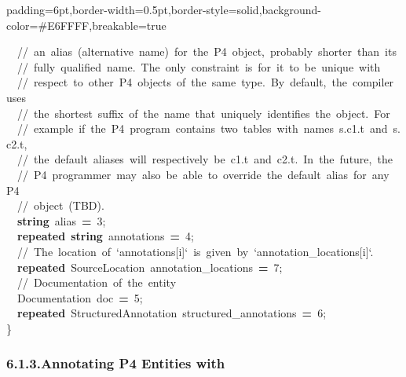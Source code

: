 \documentclass[11pt]{article}
\begin{document}
{\begin{mdbmargintb}{6pt}{6pt}
\begin{mdblock}{padding=6pt,border-width=0.5pt,border-style=solid,background-color=\#E6FFFF,breakable=true}
\begin{mdpre}
{{~~{//~an~alias~(alternative~name)~for~the~P4~object,~probably~shorter~than~its}\\
~~{//~fully~qualified~name.~The~only~constraint~is~for~it~to~be~unique~with}\\
~~{//~respect~to~other~P4~objects~of~the~same~type.~By~default,~the~compiler~uses}\\
~~{//~the~shortest~suffix~of~the~name~that~uniquely~identifies~the~object.~For}\\
~~{//~example~if~the~P4~program~contains~two~tables~with~names~s.c1.t~and~s.c2.t,}\\
~~{//~the~default~aliases~will~respectively~be~c1.t~and~c2.t.~In~the~future,~the}\\
~~{//~P4~programmer~may~also~be~able~to~override~the~default~alias~for~any~P4}\\
~~{//~object~(TBD).}\\
~~{\bfseries{string}}~alias~{\bfseries{=}}~{3};\\
~~{\bfseries{repeated}}~{\bfseries{string}}~annotations~{\bfseries{=}}~{4};\\
~~{//~The~location~of~`annotations{}[i]`~is~given~by~`annotation\_locations{}[i]`.}\\
~~{\bfseries{repeated}}~SourceLocation~annotation\_locations~{\bfseries{=}}~{7};\\
~~{//~Documentation~of~the~entity}\\
~~Documentation~doc~{\bfseries{=}}~{5};\\
~~{\bfseries{repeated}}~StructuredAnnotation~structured\_annotations~{\bfseries{=}}~{6};\\
\}}}%
\end{mdpre}%
\end{mdblock}%
\end{mdbmargintb}%

\subsubsection{6.1.3.\hspace*{0.5em}Annotating P4 Entities with }\label{sec-annotating-p4-entities-with-documentation}%

}
\end{document}
